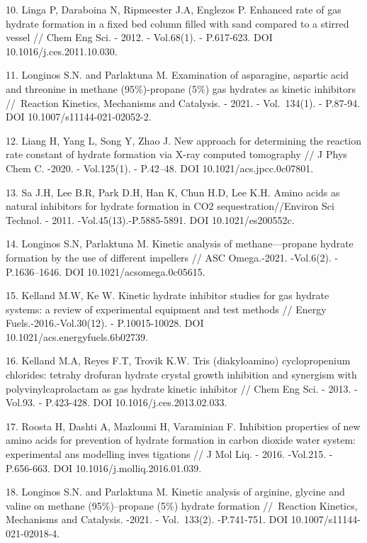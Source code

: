 \begin{refs}
10. Linga P, Daraboina N, Ripmeester J.A, Englezos P. Enhanced rate of
gas hydrate formation in a fixed bed column filled with sand compared to
a stirred vessel // Chem Eng Sci. - 2012. - Vol.68(1). - P.617-623.
DOI 10.1016/j.ces.2011.10.030.

11. Longinos S.N. and Parlaktuna M. Examination of asparagine, aspartic
acid and threonine in methane (95\%)-propane (5\%) gas hydrates as
kinetic inhibitors //~Reaction Kinetics, Mechanisms and Catalysis. -
2021. - Vol.~134(1). - P.87-94. DOI 10.1007/s11144-021-02052-2.

12. Liang H, Yang L, Song Y, Zhao J. New approach for determining the
reaction rate constant of hydrate formation via X-ray computed
tomography // J Phys Chem C. -2020. - Vol.125(1). - P.42--48. DOI
10.1021/acs.jpcc.0c07801.

13. Sa J.H, Lee B.R, Park D.H, Han K, Chun H.D, Lee K.H. Amino
acids as natural inhibitors for hydrate formation in CO2
sequestration//Environ Sci Technol. -
2011. -Vol.45(13).-P.5885-5891. DOI 10.1021/es200552c.

14. Longinos S.N, Parlaktuna M. Kinetic analysis of methane---propane
hydrate formation by the use of different impellers // ASC Omega.-2021.
-Vol.6(2). - P.1636--1646. DOI 10.1021/acsomega.0c05615.

15. Kelland M.W, Ke W. Kinetic hydrate inhibitor studies for gas hydrate
systems: a review of experimental equipment and test methods // Energy
Fuels.-2016.-Vol.30(12). - P.10015-10028. DOI\\
10.1021/acs.energyfuels.6b02739.

16. Kelland M.A, Reyes F.T, Trovik K.W. Tris (diakyloamino)
cyclopropenium chlorides: tetrahy drofuran hydrate crystal growth
inhibition and synergism with polyvinylcaprolactam as gas hydrate
kinetic inhibitor // Chem Eng Sci. - 2013. - Vol.93. - P.423-428. DOI
10.1016/j.ces.2013.02.033.

17. Roosta H, Dashti A, Mazloumi H, Varaminian F. Inhibition properties
of new amino acids for prevention of hydrate formation in carbon dioxide
water system: experimental ans modelling inves tigations // J Mol Liq. -
2016. -Vol.215. - P.656-663. DOI 10.1016/j.molliq.2016.01.039.

18. Longinos S.N. and Parlaktuna M. Kinetic analysis of arginine,
glycine and valine on methane (95\%)--propane (5\%) hydrate formation
//~Reaction Kinetics, Mechanisms and Catalysis. -2021. - Vol.~133(2).
-P.741-751. DOI 10.1007/s11144-021-02018-4.


\end{refs}
